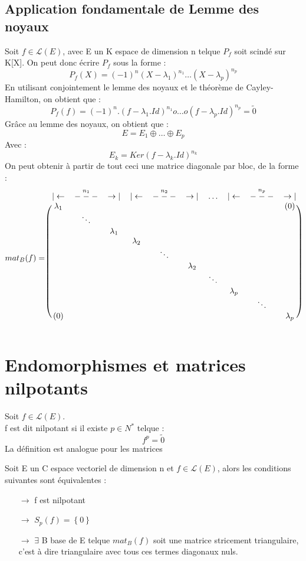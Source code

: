 \subsection{Application fondamentale de Lemme des noyaux}
Soit $f \in \mathcal{L}(E)$, avec E un K espace de dimension n telque $P_f$ soit scindé sur K[X]. On peut donc écrire $P_f$ sous la forme : 
$$P_f(X) = (-1)^n(X-\lambda_1)^{n_1}\dots(X-\lambda_p)^{n_p}$$
En utilisant conjointement le lemme des noyaux et le théorème de Cayley-Hamilton, on obtient que : 
$$P_f(f) = (-1)^n.(f-\lambda_1.Id)^{n_1}o\dots o (f-\lambda_p.Id)^{n_p} = \tilde{0}$$
Grâce au lemme des noyaux, on obtient que :
$$E = E_1 \oplus \dots \oplus E_p$$
Avec :
$$E_k = Ker(f-\lambda_k.Id)^{n_k}$$
On peut obtenir à partir de tout ceci une matrice diagonale par bloc, de la forme : 
\[mat_{B}(f) = \begin{blockarray}{cccccccccc}
        | \leftarrow & -\overset{n_1}-- &\rightarrow | & | \leftarrow & -\overset{n_2}-- &\rightarrow|& \dots  & |\leftarrow & -\overset{n_p}-- & \rightarrow| \\
        \begin{block}{(cccccccccc)}
           \lambda_1 &  &  & & & & & & & (0) \\
   	   & \ddots & & & & & & & \\
  	   &  & \lambda_1 & &  & & & & &\\
  	   &  &  & \lambda_2 & & & & & & \\
  	   &  &  &  & \ddots & & & & &\\
 	   &  &  &  & & \lambda_2 & & & & \\
 	   &  &  &  & &  & \ddots & & &\\
 	   &  &  &  & &  &  & \lambda_p & &\\
 	   &  &  &  & &  & & & \ddots &\\
  	  (0) &  &  &  & &  &  & & & \lambda_p\\
        \end{block}
        \end{blockarray}
\]
\section{Endomorphismes et matrices nilpotants}
\begin{de}
Soit $f \in \mathcal{L}(E)$.\\
f est dit nilpotant si il existe $p \in N^*$ telque : 
$$f^p = \tilde{0}$$
La définition est analogue pour les matrices
\end{de}
\begin{prop}
Soit E un C espace vectoriel de dimension n et $f \in \mathcal{L}(E)$, alors les conditions suivantes sont équivalentes :
\begin{itemize}
 \item[$\rightarrow$] f est nilpotant
 \item[$\rightarrow$] $S_p(f) = \left\lbrace 0 \right\rbrace $
 \item[$\rightarrow$] $\exists$ B base de E telque $mat_B(f)$ soit une matrice stricement triangulaire, c'est à dire triangulaire avec tous ces termes diagonaux nuls.
\end{itemize}
\end{prop}


